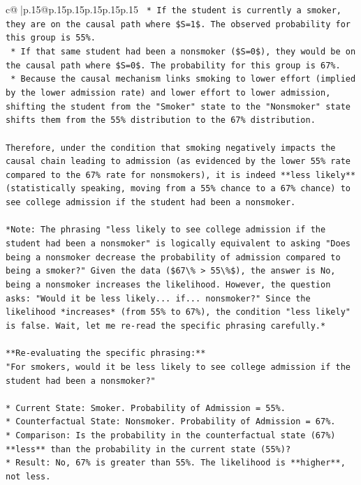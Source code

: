 \documentclass{article}
\begin{document}
{\begin{supertabular}{c@{$\;$}|p{.15\linewidth}@{}p{.15\linewidth}p{.15\linewidth}p{.15\linewidth}p{.15\linewidth}p{.15\linewidth}}
{{{\texttt{    *   If the student is currently a smoker, they are on the causal path where \$S=1\$. The observed probability for this group is 55\%.} \\
\texttt{    *   If that same student had been a nonsmoker (\$S=0\$), they would be on the causal path where \$S=0\$. The probability for this group is 67\%.} \\
\texttt{    *   Because the causal mechanism links smoking to lower effort (implied by the lower admission rate) and lower effort to lower admission, shifting the student from the "Smoker" state to the "Nonsmoker" state shifts them from the 55\% distribution to the 67\% distribution.} \\
\\ 
\texttt{Therefore, under the condition that smoking negatively impacts the causal chain leading to admission (as evidenced by the lower 55\% rate compared to the 67\% rate for nonsmokers), it is indeed **less likely** (statistically speaking, moving from a 55\% chance to a 67\% chance) to see college admission if the student had been a nonsmoker.} \\
\\ 
\texttt{*Note: The phrasing "less likely to see college admission if the student had been a nonsmoker" is logically equivalent to asking "Does being a nonsmoker decrease the probability of admission compared to being a smoker?" Given the data (\$67\textbackslash{}\% > 55\textbackslash{}\%\$), the answer is No, being a nonsmoker increases the likelihood. However, the question asks: "Would it be less likely... if... nonsmoker?" Since the likelihood *increases* (from 55\% to 67\%), the condition "less likely" is false. Wait, let me re{-}read the specific phrasing carefully.*} \\
\\ 
\texttt{**Re{-}evaluating the specific phrasing:**} \\
\texttt{"For smokers, would it be less likely to see college admission if the student had been a nonsmoker?"} \\
\\ 
\texttt{*   Current State: Smoker. Probability of Admission = 55\%.} \\
\texttt{*   Counterfactual State: Nonsmoker. Probability of Admission = 67\%.} \\
\texttt{*   Comparison: Is the probability in the counterfactual state (67\%) **less** than the probability in the current state (55\%)?} \\
\texttt{*   Result: No, 67\% is greater than 55\%. The likelihood is **higher**, not less.} \\
}}}
\end{supertabular}}
\end{document}

